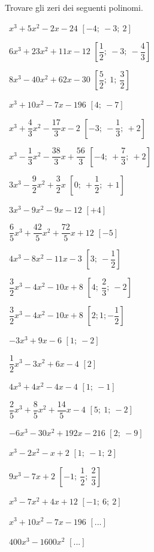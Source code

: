 \begin{esercizio}[\Ast]
 \label{ese:5.1}
Trovare gli zeri dei seguenti polinomi.
\begin{multicols}{2}
 \begin{enumeratea}
 \item~\(x^3+5x^2-2x-24\) \hfill \(\left[-4;~-3;~2\right]\)
 \item~\(6x^3+23x^2+11x-12\) \hfill \(\left[\dfrac 1 2;~-3;~-\dfrac 4 
3\right]\)
 \item~\(8x^3-40x^2+62x-30\) \hfill \(\left[\dfrac 5 2;~1;~\dfrac 3 
2\right]\)
 \item~\(x^3+10x^2-7x-196\) \hfill \(\left[4;~-7\right]\)
 \item~\(x^3+\dfrac 4 3x^2-\dfrac{17} 3x-2\) 
  \hfill \(\left[-3;~-\dfrac 1 3;~+2\right]\)
 \item~\(x^3-\dfrac 1 3x^2-\dfrac{38} 3x+\dfrac{56} 3\) 
  \hfill \(\left[-4;~+\dfrac 7 3;~+2\right]\)
 \item~\(3x^3-\dfrac 9 2x^2+\dfrac 3 2x\) \hfill \(\left[0;~+\dfrac 1 
2;~+1\right]\)
 \item~\(3x^3-9x^2-9x-12\) \hfill \(\left[+4\right]\)
 \item~\(\dfrac 6 5x^3+\dfrac{42} 5x^2+\dfrac{72} 5x+12\) \hfill 
\(\left[-5\right]\)
 \item~\(4x^3-8x^2-11x-3\) \hfill \(\left[3;~-\dfrac 1 2\right]\)
 \item~\(\dfrac 3 2x^3-4x^2-10x+8\) \hfill \(\left[4;~\dfrac 2 
3;~-2\right]\)
 \item~\(\dfrac 3 2x^3-4x^2-10x+8\) \hfill \(\left[2;1;-\dfrac 1 2\right]\)
 \item~\(-3x^3+9x-6\) \hfill \(\left[1;~-2\right]\)
 \item~\(\dfrac 1 2x^3-3x^2+6x-4\) \hfill \(\left[2\right]\)
 \item~\(4x^3+4x^2-4x-4\) \hfill \(\left[1;~-1\right]\)
 \item~\(\dfrac 2 5x^3+\dfrac 8 5x^2+\dfrac{14} 5x-4\) \hfill 
\(\left[5;~1;~-2\right]\)
 \item~\(-6x^3-30x^2+192x-216\) \hfill \(\left[2;~-9\right]\)
 \item~\(x^3-2x^2-x+2\) \hfill \(\left[1;~-1;~2\right]\)
 \item~\(9x^3-7x+2\) \hfill \(\left[-1;~\dfrac 1 2;~\dfrac 2 3\right]\)
 \item~\(x^3-7x^2+4x+12\) \hfill \(\left[-1;~6;~2\right]\)
 \item~\( x^3+10x^2-7x-196 \) \hfill \(\left[...\right]\)
 \item~\( 400x^3-1600x^2\) \hfill \(\left[...\right]\)

\end{enumeratea}
\end{multicols}
\end{esercizio}
